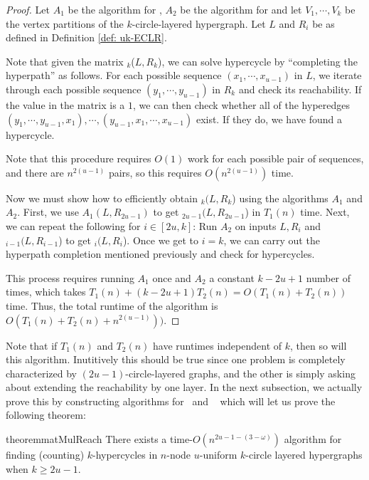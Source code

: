 \documentclass[11pt,letterpaper,pdftex]{article}
\begin{document}
\begin{proof}
    Let $A_1$ be the algorithm for \uCLR, $A_2$ be the algorithm for  and let $V_1, \cdots, V_k$ be the vertex partitions of the $k$-circle-layered hypergraph.
    Let $L$ and $R_i$ be as defined in Definition \ref{def: uk-ECLR}.

    Note that given the matrix \uCLR$_k$($L,R_k$), we can solve hypercycle by ``completing the hyperpath'' as follows.
    For each possible sequence $(x_1, \cdots, x_{u-1})$ in $L$, we iterate through each possible sequence $(y_1, \cdots, y_{u-1})$ in $R_k$ and check its reachability.
    If the value in the matrix is a $1$, we can then check whether all of the hyperedges $(y_1, \cdots, y_{u-1},x_1), \cdots , (y_{u-1},x_1, \cdots, x_{u-1})$ exist.
    If they do, we have found a hypercycle. 
    
    Note that this procedure requires $O(1)$ work for each possible pair of sequences, and there are $n^{2(u-1)}$ pairs, so this requires $O(n^{2(u-1)})$ time.

    Now we must show how to efficiently obtain \uCLR$_k(L,R_k$) using the algorithms $A_1$ and $A_2$.
    First, we use $A_1(L,R_{2u-1})$ to get \uCLR$_{2u-1}(L,R_{2u-1}$) in $T_1(n)$ time.
    Next, we can repeat the following for $i \in [2u,k]$: Run $A_2$ on inputs $L,R_i$ and \uCLR$_{i-1}(L,R_{i-1}$) to get \uCLR$_{i}(L,R_{i}$).
    Once we get to $i=k$, we can carry out the hyperpath completion mentioned previously and check for hypercycles. 

    This process requires running $A_1$ once and $A_2$ a constant $k-2u+1$ number of times, which takes $T_1(n)+(k-2u+1)T_2(n)=O(T_1(n)+T_2(n))$ time.
    Thus, the total runtime of the algorithm is $O(T_1(n)+T_2(n)+n^{2(u-1)}))$.
\end{proof}

Note that if $T_1(n)$ and $T_2(n)$ have runtimes independent of $k$, then so will this algorithm.
Inutitively this should be true since one problem is completely characterized by $(2u-1)$-circle-layered graphs, and the other is simply asking about extending the reachability by one layer.
In the next subsection, we actually prove this by constructing algorithms for \uCLR~and ~ which will let us prove the following theorem:


\begin{restatable}{theorem}{matMulReach}\label{thm:matmul_reachability}
There exists a time-$O(n^{2u-1-(3-\omega)})$ algorithm for finding (counting) $k$-hypercycles in $n$-node $u$-uniform $k$-circle layered hypergraphs when $k \geq 2u-1$.
\end{restatable}
\end{document}
